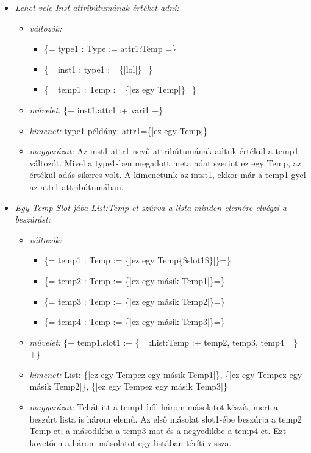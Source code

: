 {\begin{itemize}
\item \emph{Lehet vele Inst attribútumának értéket adni:}
\begin{itemize}
\item \emph{változók:}
\begin{itemize}
\item \{= type1 : Type  := attr1:Temp =\}
\item \{= inst1 : type1 := \{|lol|\}=\}
\item \{= temp1 : Temp  := \{|ez egy Temp|\}=\}
\end{itemize}
\item \emph{művelet:}
\{+ inst1.attr1 :+ vari1 +\} 
\item \emph{kimenet:}
type1 példány: attr1=\{|ez egy Temp|\}
\item \emph{magyarázat:}
Az inst1 attr1 nevű attribútumának adtuk értékül a temp1 változót.
Mivel a type1-ben megadott meta adat szerint ez egy Temp, az értékül adás sikeres volt.
A kimenetünk az intst1, ekkor már a temp1-gyel az attr1 attribútumában.
\end{itemize}

\item \emph{Egy Temp Slot-jába List:Temp-et szúrva a lista minden elemére elvégzi a beszúrást:}
\begin{itemize}
\item \emph{változók:}
\begin{itemize}
\item \{= temp1 : Temp  := \{|ez egy Temp\{\$slot1\$\}|\}=\}
\item \{= temp2 : Temp  := \{|ez egy másik Temp1|\}=\}
\item \{= temp3 : Temp  := \{|ez egy másik Temp2|\}=\}
\item \{= temp4 : Temp  := \{|ez egy másik Temp3|\}=\}
\end{itemize}
\item \emph{művelet:}
\{+ temp1.slot1 :+ \{= :List:Temp :+ temp2, temp3, temp4 =\} +\} 
\item \emph{kimenet:}
List: \{|ez egy Tempez egy másik Temp1|\}, \{|ez egy Tempez egy másik Temp2|\}, \{|ez egy Tempez egy másik Temp3|\}
\item \emph{magyarázat:}
Tehát itt a temp1 ből három másolatot készít, mert a beszúrt lista is három elemű.
Az első másolat slot1-ébe beszúrja a temp2 Temp-et; a másodikba a temp3-mat és a negyedikbe a temp4-et.
Ezt követően a három másolatot egy listában téríti vissza.
\end{itemize}


\end{itemize}}
